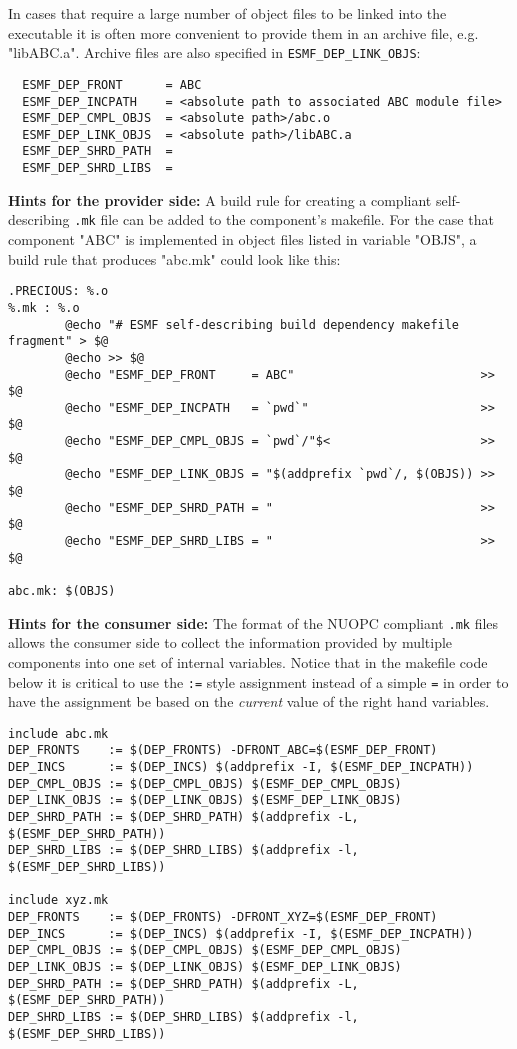 In cases that require a large number of object files to be linked into the executable it is often more convenient to provide them in an archive file, e.g. "libABC.a". Archive files are also specified in {\tt ESMF\_DEP\_LINK\_OBJS}:

\begin{verbatim}
  ESMF_DEP_FRONT      = ABC
  ESMF_DEP_INCPATH    = <absolute path to associated ABC module file>
  ESMF_DEP_CMPL_OBJS  = <absolute path>/abc.o
  ESMF_DEP_LINK_OBJS  = <absolute path>/libABC.a
  ESMF_DEP_SHRD_PATH  = 
  ESMF_DEP_SHRD_LIBS  =
\end{verbatim}

{\bf Hints for the provider side:} A build rule for creating a compliant self-describing {\tt .mk} file can be added to the component's makefile. For the case that component "ABC" is implemented in object files listed in variable "OBJS", a build rule that produces "abc.mk" could look like this:

\begin{verbatim}
.PRECIOUS: %.o
%.mk : %.o
        @echo "# ESMF self-describing build dependency makefile fragment" > $@
        @echo >> $@
        @echo "ESMF_DEP_FRONT     = ABC"                          >> $@
        @echo "ESMF_DEP_INCPATH   = `pwd`"                        >> $@
        @echo "ESMF_DEP_CMPL_OBJS = `pwd`/"$<                     >> $@
        @echo "ESMF_DEP_LINK_OBJS = "$(addprefix `pwd`/, $(OBJS)) >> $@
        @echo "ESMF_DEP_SHRD_PATH = "                             >> $@
        @echo "ESMF_DEP_SHRD_LIBS = "                             >> $@

abc.mk: $(OBJS)
\end{verbatim}

{\bf Hints for the consumer side:} The format of the NUOPC compliant {\tt .mk} files allows the consumer side to collect the information provided by multiple components into one set of internal variables. Notice that in the makefile code below it is critical to use the {\tt :=} style assignment instead of a simple {\tt =} in order to have the assignment be based on the {\em current} value of the right hand variables.

\begin{verbatim}
include abc.mk
DEP_FRONTS    := $(DEP_FRONTS) -DFRONT_ABC=$(ESMF_DEP_FRONT)
DEP_INCS      := $(DEP_INCS) $(addprefix -I, $(ESMF_DEP_INCPATH))
DEP_CMPL_OBJS := $(DEP_CMPL_OBJS) $(ESMF_DEP_CMPL_OBJS)
DEP_LINK_OBJS := $(DEP_LINK_OBJS) $(ESMF_DEP_LINK_OBJS)
DEP_SHRD_PATH := $(DEP_SHRD_PATH) $(addprefix -L, $(ESMF_DEP_SHRD_PATH))
DEP_SHRD_LIBS := $(DEP_SHRD_LIBS) $(addprefix -l, $(ESMF_DEP_SHRD_LIBS))

include xyz.mk
DEP_FRONTS    := $(DEP_FRONTS) -DFRONT_XYZ=$(ESMF_DEP_FRONT)
DEP_INCS      := $(DEP_INCS) $(addprefix -I, $(ESMF_DEP_INCPATH))
DEP_CMPL_OBJS := $(DEP_CMPL_OBJS) $(ESMF_DEP_CMPL_OBJS)
DEP_LINK_OBJS := $(DEP_LINK_OBJS) $(ESMF_DEP_LINK_OBJS)
DEP_SHRD_PATH := $(DEP_SHRD_PATH) $(addprefix -L, $(ESMF_DEP_SHRD_PATH))
DEP_SHRD_LIBS := $(DEP_SHRD_LIBS) $(addprefix -l, $(ESMF_DEP_SHRD_LIBS))
\end{verbatim}

